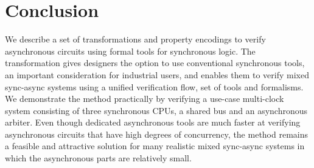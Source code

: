 \section{Conclusion}

We describe a set of transformations and property encodings to verify
asynchronous circuits using formal tools for synchronous logic. The
transformation gives designers the option to use conventional synchronous
tools, an important consideration for industrial users, and enables them to
verify mixed sync-async systems using a unified verification flow, set of
tools and formalisms. We demonstrate the method practically by verifying a
use-case multi-clock system consisting of three synchronous CPUs, a shared bus
and an asynchronous arbiter. Even though dedicated asynchronous tools are much
faster at verifying asynchronous circuits that have high degrees of
concurrency, the method remains a feasible and attractive solution for many
realistic mixed sync-async systems in which the asynchronous parts are
relatively small.

